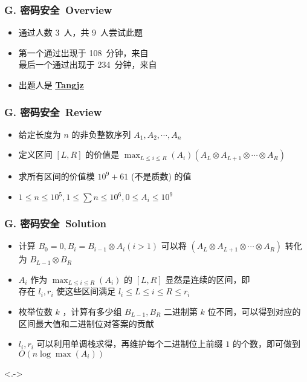 \documentclass[notheorems]{beamer}
\newcommand{\zhProbG}{密码安全}		\newcommand{\AuthProbG}{\textbf{\underline{\href{http://codeforces.com/profile/Tangjz}{Tangjz}}}}
\newcommand{\AccInProbG}{3}	\newcommand{\SubInProbG}{9}	\newcommand{\RatInProbG}{33.33\%}
\newcommand{\FirPenInProbG}{108}	\newcommand{\FirPerInProbG}{\NONE}
\newcommand{\LasPenInProbG}{234}	\newcommand{\LasPerInProbG}{\NONE}
\begin{document}
\begin{frame}[label = ProbG]
\frametitle{G. \zhProbG\ Overview}
\begin{spacing}{2.0} \large
\begin{itemize}[<+->]
\item 通过人数 \AccInProbG\ 人，共 \SubInProbG\ 人尝试此题
\item 第一个通过出现于 \FirPenInProbG\ 分钟，来自 \FirPerInProbG\ 
\\ 最后一个通过出现于 \LasPenInProbG\ 分钟，来自 \LasPerInProbG\ 
\item 出题人是 \AuthProbG\ 
\end{itemize}
\end{spacing}
\end{frame}
\begin{frame}
\frametitle{G. \zhProbG\ Review}
\begin{spacing}{2.0} \large
\begin{itemize}[<+->]
\item 给定长度为 $n$ 的非负整数序列 $A_1, A_2, \cdots, A_n$
\item 定义区间 $[L, R]$ 的价值是 $\displaystyle{\max_{L \leq i \leq R}(A_i)} (A_L \otimes A_{L+1} \otimes \cdots \otimes A_R)$
\item 求所有区间的价值模 $10^9 + 61$ (不是质数) 的值
\item $1 \leq n \leq 10^5, 1 \leq \sum{n} \leq 10^6, 0 \leq A_i \leq 10^9$
\end{itemize}
\end{spacing}
\end{frame}
\begin{frame}
\frametitle{G. \zhProbG\ Solution}
\begin{spacing}{1.8} \large
\begin{itemize}[<+->]
\item 计算 $B_0 = 0, B_i = B_{i - 1} \otimes A_i (i > 1)$ 可以将 $(A_L \otimes A_{L+1} \otimes \cdots \otimes A_R)$ 转化为 $B_{L - 1} \otimes B_{R}$
\item  $A_i$ 作为 $\displaystyle{\max_{L \leq i \leq R}(A_i)}$ 的 $[L, R]$ 显然是连续的区间，即 \\ 存在 $l_i, r_i$ 使这些区间满足 $l_i \leq L \leq i \leq R \leq r_i$
\item 枚举位数 $k$ ，计算有多少组 $B_{L-1}, B_R$ 二进制第 $k$ 位不同，可以得到对应的\alert{区间最大值}和\alert{二进制位}对答案的贡献
\item $l_i, r_i$ 可以利用单调栈求得，再维护每个二进制位上前缀 $1$ 的个数，即可做到 $O(n \log \max(A_i))$
\end{itemize}
\end{spacing}
\visible<.->{\hyperlink{Overview}{\beamerreturnbutton{Go Back}}}
\end{frame}
\end{document}
